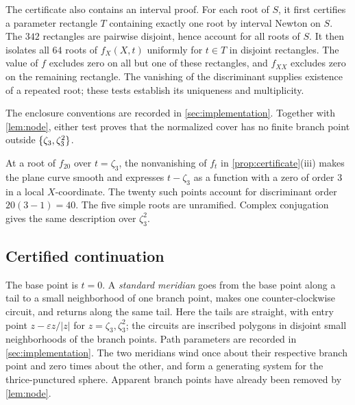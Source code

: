 The certificate also contains an interval proof. For each root
of $S$, it first certifies a parameter rectangle
$T$ containing exactly one root by interval Newton on $S$. The $342$
rectangles are pairwise disjoint, hence account for all roots of $S$.
It then isolates all $64$ roots of $f_X(X,t)$ uniformly for $t\in T$ in
disjoint rectangles. The value of $f$ excludes zero on all but one of
these rectangles, and $f_{XX}$ excludes zero on the remaining rectangle.
The vanishing of the discriminant supplies existence of a repeated root;
these tests establish its uniqueness and multiplicity.

The enclosure conventions are recorded in \cref{sec:implementation}.
Together with \cref{lem:node}, either test proves that the normalized cover has
no finite branch point outside $\{\zeta_3,\zeta_3^2\}$.

At a root of $f_{20}$ over $t=\zeta_3$, the nonvanishing of $f_t$ in
\cref{prop:certificate}\textup{(iii)} makes the plane curve smooth and
expresses $t-\zeta_3$ as a function with a zero of order $3$ in a local
$X$-coordinate. The twenty such points account for discriminant order
$20(3-1)=40$. The five simple roots are unramified. Complex conjugation
gives the same description over $\zeta_3^2$.

\subsection{Certified continuation}

The base point is $t=0$. A \emph{standard meridian} goes from the base
point along a tail to a small neighborhood of one branch point, makes one
counter-clockwise circuit, and returns along the same tail. Here the tails
are straight, with entry point $z-\varepsilon z/|z|$ for
$z=\zeta_3,\zeta_3^2$; the circuits are inscribed polygons in disjoint
small neighborhoods of the branch points. Path parameters are recorded
in \cref{sec:implementation}.
The two meridians wind once about their respective branch point and zero
times about the other, and form a generating system for the thrice-punctured
sphere. Apparent branch points have already been removed by \cref{lem:node}.

